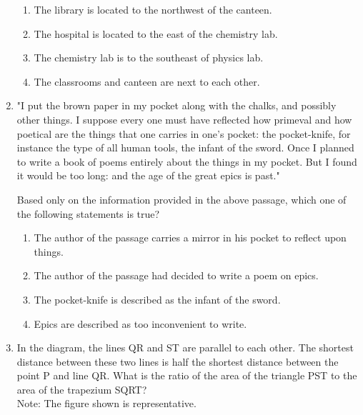 \documentclass[a4paper, 11pt]{article}
\begin{document}
\begin{enumerate}
\begin{figure}[H]
        \label{fig:placeholder}
    \end{figure}
    \begin{enumerate}
        \item The library is located to the northwest of the canteen.
        \item The hospital is located to the east of the chemistry lab.
        \item The chemistry lab is to the southeast of physics lab.
        \item The classrooms and canteen are next to each other.
    \end{enumerate}
    \hfill{}
    \item 
    \begin{quoting}
    "I put the brown paper in my pocket along with the chalks, and possibly other things. I suppose every one must have reflected how primeval and how poetical are the things that one carries in one's pocket: the pocket-knife, for instance the type of all human tools, the infant of the sword. Once I planned to write a book of poems entirely about the things in my pocket. But I found it would be too long: and the age of the great epics is past."\\
    \end{quoting}
    Based only on the information provided in the above passage, which one of the following statements is true?
    \begin{enumerate}
        \item The author of the passage carries a mirror in his pocket to reflect upon things.
        \item The author of the passage had decided to write a poem on epics.
        \item The pocket-knife is described as the infant of the sword.
        \item Epics are described as too inconvenient to write.
    \end{enumerate}
    \hfill{}
    \item In the diagram, the lines QR and ST are parallel to each other. The shortest distance between these two lines is half the shortest distance between the point P and line QR. What is the ratio of the area of the triangle PST to the area of the trapezium SQRT?\\Note: The figure shown is representative.
    \begin{figure}[H]

\end{figure}
\end{enumerate}
\end{document}
